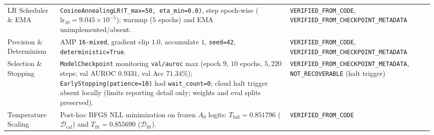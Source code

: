 \begin{table}[!htbp]
{\begin{tabular}{@{}p{2.7cm}p{6.6cm}p{4.8cm}@{}}
LR Scheduler \& EMA & \texttt{CosineAnnealingLR(T\_max=50, eta\_min=0.0)}, step epoch-wise ($\mathrm{lr}_{10}=9.045\times 10^{-5}$); warmup ($5$ epochs) and EMA unimplemented/absent. & \texttt{VERIFIED\_FROM\_CODE}, \texttt{VERIFIED\_FROM\_CHECKPOINT\_METADATA} \\
Precision \& Determinism & AMP \texttt{16-mixed}, gradient clip $1.0$, accumulate $1$, \texttt{seed=42}, \texttt{deterministic=True}. & \texttt{VERIFIED\_FROM\_CODE}, \texttt{VERIFIED\_FROM\_CHECKPOINT\_METADATA} \\
Selection \& Stopping & \texttt{ModelCheckpoint} monitoring \texttt{val/auroc} max (epoch $9$, $10$ epochs, $5{,}220$ steps; val AUROC $0.9331$, val Acc $71.34\%$); \texttt{EarlyStopping(patience=10)} had \texttt{wait\_count=0}; cloud halt trigger absent locally (limits reporting detail only; weights and eval splits preserved). & \texttt{VERIFIED\_FROM\_CHECKPOINT\_METADATA}, \texttt{NOT\_RECOVERABLE} (halt trigger) \\
Temperature Scaling & Post-hoc BFGS NLL minimization on frozen $A_0$ logits: $T_{\mathrm{full}}=0.851796$ ($\mathcal{D}_{\mathrm{cal}}$) and $T_{\mathrm{fit}}=0.855690$ ($\mathcal{D}_{\mathrm{fit}}$). & \texttt{VERIFIED\_FROM\_CODE} \\
\bottomrule
\end{tabular}%
}
\end{table}
